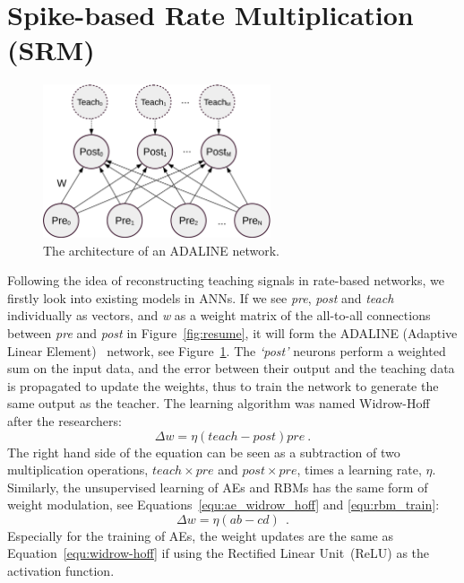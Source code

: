 \section{Spike-based Rate Multiplication (SRM)}
\label{sec:SRM}
\begin{figure}
	\centering
	\includegraphics[width=0.6\textwidth]{pics_sdlm/adaline.png}
	\caption{The architecture of an ADALINE network.}
	\label{fig:adaline}
\end{figure}
Following the idea of reconstructing teaching signals in rate-based networks, we firstly look into existing models in ANNs.
If we see \textit{pre}, \textit{post} and \textit{teach} individually as vectors, and \textit{w} as a weight matrix of the all-to-all connections between \textit{pre} and \textit{post} in Figure~\ref{fig:resume}, it will form the ADALINE (Adaptive Linear Element)~\citep{widrow1960adaptive} network, see Figure~\ref{fig:adaline}.
The \textit{`post'} neurons perform a weighted sum on the input data, and the error between their output and the teaching data is propagated to update the weights, thus to train the network to generate the same output as the teacher. 
The learning algorithm was named Widrow-Hoff after the researchers:
\begin{equation}
\Delta w = \eta (teach - post)pre~.
\label{equ:widrow-hoff}
\end{equation}
The right hand side of the equation can be seen as a subtraction of two multiplication operations, $teach \times pre$ and $post \times pre$, times a learning rate, $\eta$.
Similarly, the unsupervised learning of AEs and RBMs has the same form of weight modulation, see Equations~\ref{equ:ae_widrow_hoff} and \ref{equ:rbm_train}:
\begin{equation}
\Delta w = \eta (ab-cd)~~.
\label{equ:two_sep}
\end{equation}
Especially for the training of AEs, the weight updates are the same as Equation~\ref{equ:widrow-hoff} if using the Rectified Linear Unit~(ReLU) as the activation function.

